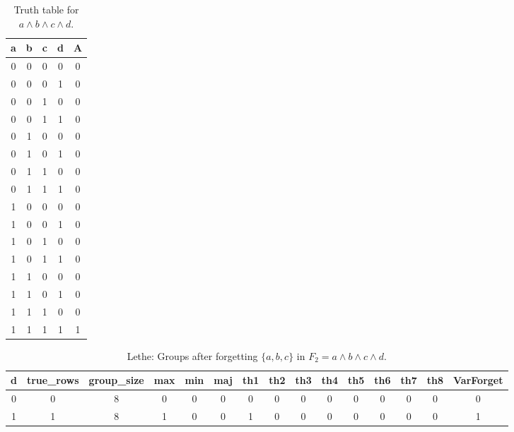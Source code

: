 \begin{table}[!tb]
    \centering
    \begin{tabular}{|c|c|c|c|c|}
        \hline
        \textbf{a} & \textbf{b} & \textbf{c} & \textbf{d} & \textbf{A} \\ \hline
        0 & 0 & 0 & 0 & 0 \\ \hline
        0 & 0 & 0 & 1 & 0 \\ \hline
        0 & 0 & 1 & 0 & 0 \\ \hline
        0 & 0 & 1 & 1 & 0 \\ \hline
        0 & 1 & 0 & 0 & 0 \\ \hline
        0 & 1 & 0 & 1 & 0 \\ \hline
        0 & 1 & 1 & 0 & 0 \\ \hline
        0 & 1 & 1 & 1 & 0 \\ \hline
        1 & 0 & 0 & 0 & 0 \\ \hline
        1 & 0 & 0 & 1 & 0 \\ \hline
        1 & 0 & 1 & 0 & 0 \\ \hline
        1 & 0 & 1 & 1 & 0 \\ \hline
        1 & 1 & 0 & 0 & 0 \\ \hline
        1 & 1 & 0 & 1 & 0 \\ \hline
        1 & 1 & 1 & 0 & 0 \\ \hline
        1 & 1 & 1 & 1 & 1 \\ \hline
    \end{tabular}
    \caption{Truth table for $a \land b \land c \land d$.}
    \label{tab:truthtab}
\end{table}

\begin{table}[!tb]
    \centering
    \begin{tabular}{|c|c|c|c|c|c|c|c|c|c|c|c|c|c|c|}
        \hline
        \textbf{d} & \textbf{true\_rows} & \textbf{group\_size} & \textbf{max} & \textbf{min} & \textbf{maj} & \textbf{th1} & \textbf{th2} & \textbf{th3} & \textbf{th4} & \textbf{th5} & \textbf{th6} & \textbf{th7} & \textbf{th8} & \textbf{VarForget} \\ \hline
        \rowcolor{gray!40} 0 & 0 & 8 & 0 & 0 & 0 & 0 & 0 & 0 & 0 & 0 & 0 & 0 & 0 & 0 \\ \hline
        \rowcolor{blue!40} 1 & 1 & 8 & 1 & 0 & 0 & 1 & 0 & 0 & 0 & 0 & 0 & 0 & 0 & 1 \\ \hline
    \end{tabular}
    \caption{Lethe: Groups after forgetting $\{a, b, c\}$ in $F_{2} = a \land b \land c \land d$.}
    \label{tab:lethe-F2-abc-groups}
\end{table}
